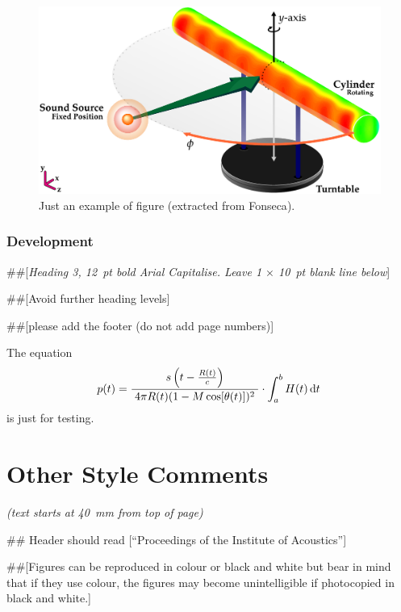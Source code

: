 \documentclass[10pt, a4paper, oneside]{article}
\begin{document}
\begin{figure}[H]
	\centering
	\includegraphics[width=0.75\linewidth]{figs/Measurement-Scheme-Fonseca-2013.pdf}%
	\caption{Just an example of figure (extracted from Fonseca\cite{Fonseca-2013}).}%
	\label{fig:beamforming}%
\end{figure}

\subsubsection{Development}

\#\#[\textit{Heading 3, 12~pt bold Arial Capitalise. Leave 1 $\times$ 10~pt blank line below}]

\#\#[Avoid further heading levels]

\#\#[please add the footer (do not add page numbers)]

The equation
\begin{equation}
p(t) = \frac{s\left( t-\frac{R(t)}{c} \right )}{\; 4\pi R(t)(1-M\,\text{cos}[\theta(t)])^2 \;} \cdot \int_a^b H(t) \operatorname{d\!} t\,
\label{eq:example}
\end{equation}
%
is just for testing.

\section{Other Style Comments}

\textit{(text starts at 40~mm from top of page)}

\#\# Header should read [``Proceedings of the Institute of Acoustics'']

\#\#[Figures can be reproduced in colour or black and white but bear in mind that if they use colour, the figures may become unintelligible if photocopied in black and white.]
\end{document}
